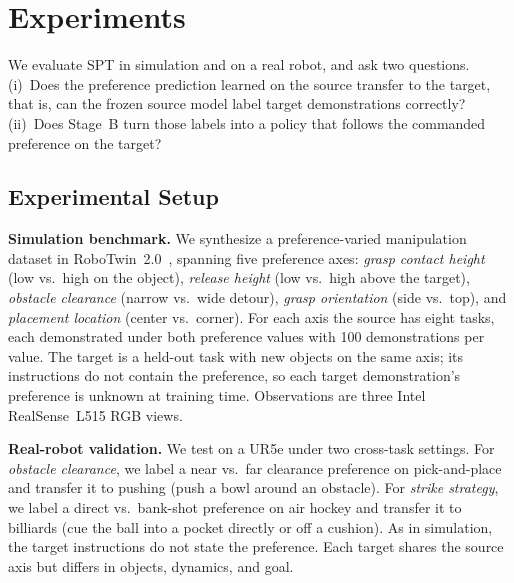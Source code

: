 %
%

\section{Experiments}
\label{sec:experiments}

We evaluate SPT in simulation and on a real robot, and ask two questions.
(i)~Does the preference prediction learned on the source transfer to the target,
that is, can the frozen source model label target demonstrations correctly?
(ii)~Does Stage~B turn those labels into a policy that follows the commanded
preference on the target?

\subsection{Experimental Setup}
\label{sec:exp-setup}

\textbf{Simulation benchmark.}
We synthesize a preference-varied manipulation dataset in
RoboTwin~2.0~\citep{robotwin}, spanning five preference axes: \emph{grasp contact
height} (low vs.\ high on the object), \emph{release height} (low vs.\ high above
the target), \emph{obstacle clearance} (narrow vs.\ wide detour), \emph{grasp
orientation} (side vs.\ top), and \emph{placement location} (center vs.\ corner).
For each axis the source has eight tasks, each demonstrated under both preference
values with 100 demonstrations per value. The target is a held-out task with new
objects on the same axis; its instructions do not contain the preference, so
each target demonstration's preference is unknown at training time. Observations
are three Intel RealSense~L515 RGB views.

\textbf{Real-robot validation.}
We test on a UR5e under two cross-task settings. For \emph{obstacle clearance},
we label a near vs.\ far clearance preference on pick-and-place and transfer it
to pushing (push a bowl around an obstacle). For \emph{strike strategy}, we label
a direct vs.\ bank-shot preference on air hockey and transfer it to billiards
(cue the ball into a pocket directly or off a cushion). As in simulation, the
target instructions do not state the preference. Each target shares the source
axis but differs in objects, dynamics, and goal.

